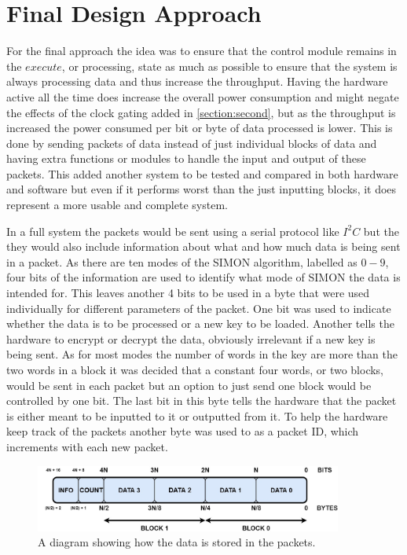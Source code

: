 \documentclass[12pt,twoside,a4paper]{report}
\begin{document}
	\chapter{Final Design Approach}
	\label{chapter:FINAL}
	For the final approach the idea was to ensure that the control module remains in the $execute$, or processing, state as much as possible to ensure that the system is always processing data and thus increase the throughput. Having the hardware active all the time does increase the overall power consumption and might negate the effects of the clock gating added in \autoref{section:second}, but as the throughput is increased the power consumed per bit or byte of data processed is lower. This is done by sending packets of data instead of just individual blocks of data and having extra functions or modules to handle the input and output of these packets. This added another system to be tested and compared in both hardware and software but even if it performs worst than the just inputting blocks, it does represent a more usable and complete system.
    
	In a full system the packets would be sent using a serial protocol like $I^2C$ but the they would also include information about what and how much data is being sent in a packet. As there are ten modes of the SIMON algorithm, labelled as $0 - 9$, four bits of the information are used to identify what mode of SIMON the data is intended for. This leaves another 4 bits to be used in a byte that were used individually for different parameters of the packet. One bit was used to indicate whether the data is to be processed or a new key to be loaded. Another tells the hardware to encrypt or decrypt the data, obviously irrelevant if a new key is being sent. As for most modes the number of words in the key are more than the two words in a block it was decided that a constant four words, or two blocks, would be sent in each packet but an option to just send one block would be controlled by one bit. The last bit in this byte tells the hardware that the packet is either meant to be inputted to it or outputted from it. To help the hardware keep track of the packets another byte was used to as a packet ID, which increments with each new packet.
    
	\begin{figure}[H]
		\includegraphics[width=0.9\textwidth]{SIMON_packet}
		\centering
		\caption{A diagram showing how the data is stored in the packets.}
		\label{fig:packet}
	\end{figure}
	
\end{document}
